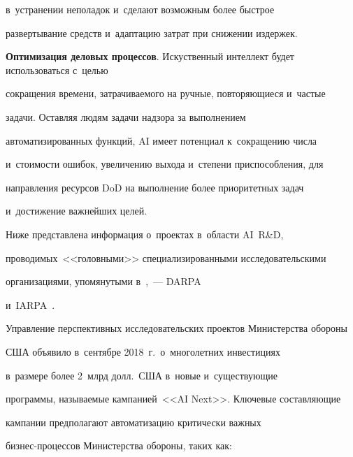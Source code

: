 \begin{description}
в~устранении неполадок и~сделают возможным более быст\-рое


развертывание средств и~адап\-та\-цию затрат при снижении издержек.


\item[\,]


  \textbf{Оптимизация деловых процессов}. Искуственный интеллект будет использоваться с~\mbox{целью}


сокращения времени, затрачиваемого на ручные, повторяющиеся и~час\-тые


задачи. Оставляя людям задачи надзора за выполнением


автоматизированных функций, AI имеет потенциал к~сокращению чис\-ла


и~стоимости ошибок, увеличению выхода и~степени приспособления, для


направления ресурсов DoD на выполнение более приоритетных задач


и~достижение важнейших целей.


\end{description}





  Ниже представлена информация о~проектах в~области AI~R\&D,


проводимых~<<головными>> специализированными исследовательскими


организациями, упомянутыми в~\cite{13-bor},~--- DARPA~\cite{14-bor}


и~\mbox{IARPA}~\cite{15-bor}.





  Управление перспективных исследовательских проектов Министерства обороны


  США объявило в~сентябре 2018~г.\ о~многолетних инвестициях


в~размере более 2~млрд долл.\ США в~новые и~существующие


программы, на\-зы\-ва\-емые кампанией~<<AI Next>>. Ключевые составляющие


кампании предполагают автоматизацию критически важных


биз\-нес-про\-цес\-сов Министерства обороны, таких как:



